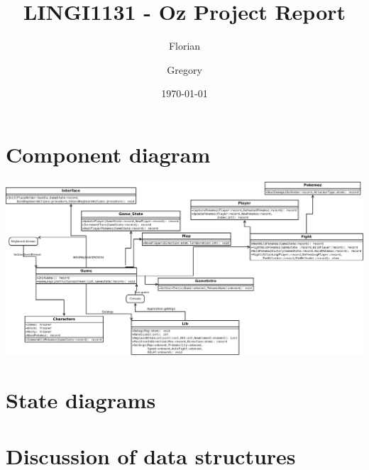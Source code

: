 \documentclass[12pt, a4paper]{article}
\author{Florian \bsc{Thuin} \and Gregory \bsc{Vander Schueren}}
\title{LINGI1131 - Oz Project Report}
\date{\today}
\begin{document}
\maketitle

\section{Component diagram}

\begin{landscape}

\includegraphics[width=\linewidth]{Diagramme1.png}

\end{landscape}


\section{State diagrams}



\section{Discussion of data structures}
\end{document}

